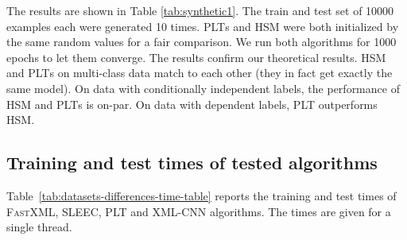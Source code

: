 \documentclass{article}
\newcommand{\Algo}[1]{\textsc{#1}}
\begin{document}
The results are shown in Table \ref{tab:synthetic1}. The train and test set of 10000 examples each were generated 10 times. \Algo{PLT}s and \Algo{HSM} were both initialized by the same random values for a fair comparison. We run both algorithms for 1000 epochs to let them converge. 
The results confirm our theoretical results. \Algo{HSM} and \Algo{PLT}s on multi-class data match to each other (they in fact get exactly the same model). On data with conditionally independent labels, the performance of \Algo{HSM} and \Algo{PLT}s is on-par. %
On data with dependent labels, \Algo{PLT} outperforms \Algo{HSM}. 



\subsection{Training and test times of tested algorithms}
\label{app:running_times}

Table~\ref{tab:datasets-differences-time-table} reports the training and test times of \Algo{FastXML}, \Algo{SLEEC}, \Algo{PLT} and \Algo{XML-CNN} algorithms. The times are given for a single thread. 
\end{document}
